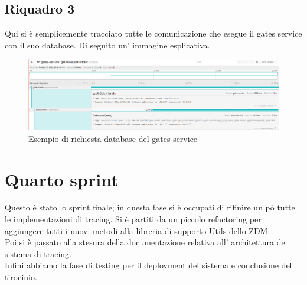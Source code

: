 \documentclass[a4paper,12pt,titlepage,italian,openany]{report}
\begin{document}
\subsection{Riquadro 3}
Qui si è semplicemente tracciato tutte le comunicazione che esegue il gates service con il suo database. Di seguito un' immagine esplicativa.
\begin{figure}[H]
    \includegraphics[scale=0.21]{90.png}
    \centering
    \caption{Esempio di richiesta database del gates service}
\end{figure}
\newpage
\section{Quarto sprint}
Questo è stato lo sprint finale; in questa fase si è occupati di rifinire un pò tutte le implementazioni di tracing. Si è partiti da un piccolo refactoring per aggiungere tutti i 
nuovi metodi alla libreria di supporto Utils dello ZDM\cite{zdm:1}.\\
Poi si è passato alla stesura della documentazione relativa all' architettura de sistema di tracing.\\Infini abbiamo la fase di testing per il deployment del sistema e conclusione del tirocinio.
\end{document}
